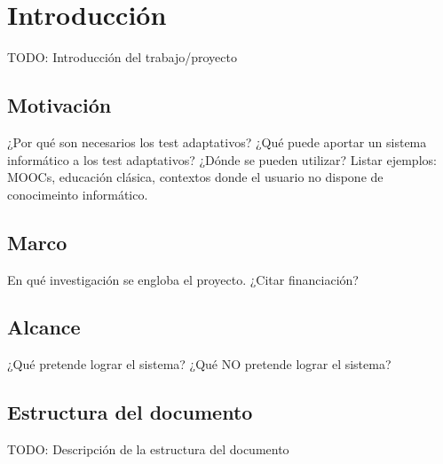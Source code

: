 \chapter{Introducción}

TODO: Introducción del trabajo/proyecto

\section{Motivación}

¿Por qué son necesarios los test adaptativos?
¿Qué puede aportar un sistema informático a los test adaptativos?
¿Dónde se pueden utilizar?
Listar ejemplos: MOOCs, educación clásica, contextos donde el usuario no dispone de conocimeinto informático.

\section{Marco}

En qué investigación se engloba el proyecto. ¿Citar financiación?

\section{Alcance}

¿Qué pretende lograr el sistema?
¿Qué NO pretende lograr el sistema?

\section{Estructura del documento}

TODO: Descripción de la estructura del documento